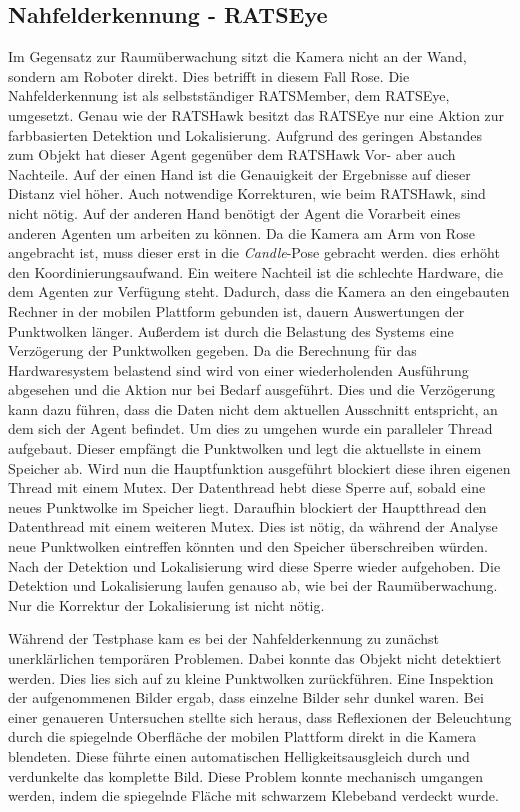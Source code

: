 \subsection{Nahfelderkennung - RATSEye}
\label{sec:eye}
Im Gegensatz zur Raumüberwachung sitzt die Kamera nicht an der Wand, sondern am Roboter direkt. Dies betrifft in diesem Fall Rose. Die Nahfelderkennung ist als selbstständiger RATSMember, dem RATSEye, umgesetzt. Genau wie der RATSHawk besitzt das RATSEye nur eine Aktion zur farbbasierten Detektion und Lokalisierung. Aufgrund des geringen Abstandes zum Objekt hat dieser Agent gegenüber dem RATSHawk Vor- aber auch Nachteile. Auf der einen Hand ist die Genauigkeit der Ergebnisse auf dieser Distanz viel höher. Auch notwendige Korrekturen, wie beim RATSHawk, sind nicht nötig. Auf der anderen Hand benötigt der Agent die Vorarbeit eines anderen Agenten um arbeiten zu können. Da die Kamera am Arm von Rose angebracht ist, muss dieser erst in die \textit{Candle}-Pose gebracht werden. dies erhöht den Koordinierungsaufwand. Ein weitere Nachteil ist die schlechte Hardware, die dem Agenten zur Verfügung steht. Dadurch, dass die Kamera an den eingebauten Rechner in der mobilen Plattform gebunden ist, dauern Auswertungen der Punktwolken länger. Außerdem ist durch die Belastung des Systems eine Verzögerung der Punktwolken gegeben. Da die Berechnung für das Hardwaresystem belastend sind wird von einer wiederholenden Ausführung abgesehen und die Aktion nur bei Bedarf ausgeführt. Dies und die Verzögerung kann dazu führen, dass die Daten nicht dem aktuellen Ausschnitt entspricht, an dem sich der Agent befindet. Um dies zu umgehen wurde ein paralleler Thread aufgebaut. Dieser empfängt die Punktwolken und legt die aktuellste in einem Speicher ab. Wird nun die Hauptfunktion ausgeführt blockiert diese ihren eigenen Thread mit einem Mutex. Der Datenthread hebt diese Sperre auf, sobald eine neues Punktwolke im Speicher liegt. Daraufhin blockiert der Hauptthread den Datenthread mit einem weiteren Mutex. Dies ist nötig, da während der Analyse neue Punktwolken eintreffen könnten und den Speicher überschreiben würden. Nach der Detektion und Lokalisierung wird diese Sperre wieder aufgehoben. Die Detektion und Lokalisierung laufen genauso ab, wie bei der Raumüberwachung. Nur die Korrektur der Lokalisierung ist nicht nötig.

Während der Testphase kam es bei der Nahfelderkennung zu zunächst unerklärlichen temporären Problemen. Dabei konnte das Objekt nicht detektiert werden. Dies lies sich auf zu kleine Punktwolken zurückführen. Eine Inspektion der aufgenommenen Bilder ergab, dass einzelne Bilder sehr dunkel waren. Bei einer genaueren Untersuchen stellte sich heraus, dass Reflexionen der Beleuchtung durch die spiegelnde Oberfläche der mobilen Plattform direkt in die Kamera blendeten. Diese führte einen automatischen Helligkeitsausgleich durch und verdunkelte das komplette Bild. Diese Problem konnte mechanisch umgangen werden, indem die spiegelnde Fläche mit schwarzem Klebeband verdeckt wurde.

